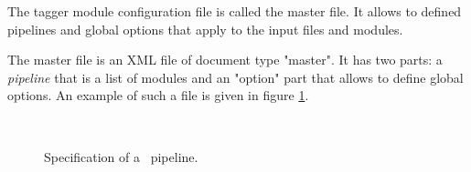 \documentclass[manual-fr.tex]{subfiles}
\begin{document}
The tagger module configuration file is called the master file. It allows to defined pipelines and global options that apply to the input files and modules.

The master file is an XML file of document type "master". It has two parts: a \emph{pipeline} that is a list of modules and an "option" part that allows to define global options. An example of such a file is given in figure \ref{fig:sem-pipeline}.\\

\begin{figure}[ht!]
\footnotesize
\begin{xml}
\\
\end{xml}
\caption{Specification of a \SEM\ pipeline.}
\label{fig:sem-pipeline}
\end{figure}
\end{document}
